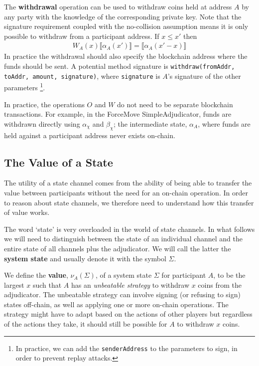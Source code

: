 \documentclass{article}
\theoremstyle{definition}
\newcommand{\adj}[1]{\llbracket #1 \rrbracket}
\begin{document}
The \textbf{withdrawal} operation can be used to withdraw coins held at address $A$ by any
party with the knowledge of the corresponding private key. 
Note that the signature requirement coupled with the no-collision assumption means
it is only possible to withdraw from a participant address.
If $x \leq x'$ then
\begin{align*}
W_A(x) \adj{\alpha_A(x')} = \adj{\alpha_A(x'-x)}
\end{align*}
In practice the withdrawal should also specify the blockchain address where the funds should be sent.
A potential method signature is \texttt{withdraw(fromAddr, toAddr, amount, signature)}, 
where \texttt{signature} is $A$'s signature of the other parameters
\footnote{In practice, we can add the \texttt{senderAddress} to the parameters to sign,
in order to prevent replay attacks.}.

In practice, the operations $O$ and $W$ do not need to be separate blockchain transactions.
For example, in the ForceMove SimpleAdjudicator, funds are withdrawn directly using $\alpha_\chi$ and $\beta_\chi$;
the intermediate state, $\alpha_A$, where funds are held against a participant address never exists on-chain.

\subsection{The Value of a State}\label{section:value-of-a-state}

The utility of a state channel comes from the ability of being able to transfer the value
between participants without the need for an on-chain operation.
In order to reason about state channels, we therefore need to understand how this transfer
of value works.

The word `state' is very overloaded in the world of state channels.
In what follows we will need to distinguish between the state of an individual channel and
the entire state of all channels plus the adjudicator.
We will call the latter the \textbf{system state} and usually denote it with the symbol $\Sigma$.

We define the \textbf{value}, $\nu_A(\Sigma)$, of a system state $\Sigma$ for participant $A$,
to be the largest $x$ such that $A$ has an \textit{unbeatable strategy} to withdraw $x$
coins from the adjudicator.
The unbeatable strategy can involve signing (or refusing to sign) states off-chain, as well as
applying one or more on-chain operations.
The strategy might have to adapt based on the actions of other players but regardless of
the actions they take, it should still be possible for $A$ to withdraw $x$ coins.
\end{document}
